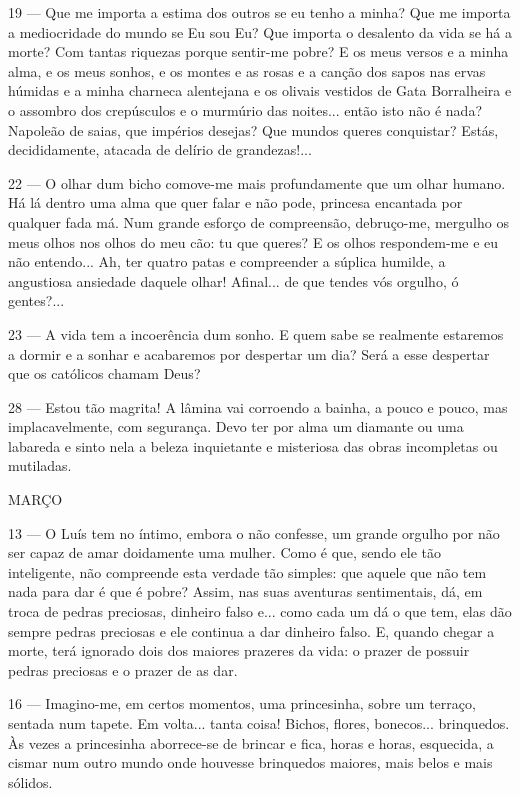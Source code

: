 19 — Que me importa a estima dos outros se eu tenho
a minha? Que me importa a mediocridade do mundo
se  Eu sou Eu? Que importa o desalento da vida se há
a morte? Com tantas riquezas porque sentir-me pobre?
E os meus versos e a minha alma, e os meus sonhos,
e os montes e as rosas e a canção dos sapos nas ervas
húmidas e a minha charneca alentejana e os olivais
vestidos de Gata Borralheira e o assombro dos 
crepúsculos e o murmúrio das noites... então isto não é
nada? Napoleão de saias, que impérios desejas? Que
mundos queres conquistar? Estás, decididamente, 
atacada de delírio de grandezas!...

22 — O olhar dum bicho comove-me mais 
profundamente que um olhar humano. Há lá dentro 
uma alma que quer falar e não pode, princesa encantada
por qualquer fada má. Num grande esforço de compreensão,
debruço-me, mergulho os meus olhos nos olhos do
meu cão: tu que queres? E os olhos respondem-me e
eu não entendo... Ah, ter quatro patas e compreender
a súplica humilde, a angustiosa ansiedade daquele
olhar! Afinal... de que tendes vós orgulho, ó gentes?...

23 — A vida tem a incoerência dum sonho. E quem sabe se 
realmente estaremos a dormir e a sonhar e acabaremos por
despertar um dia? Será a esse despertar que os católicos
chamam Deus?

28 — Estou tão magrita! A lâmina vai corroendo a
bainha, a pouco e pouco, mas implacavelmente, com
segurança. Devo ter por alma um diamante ou uma
labareda e sinto nela a beleza inquietante e misteriosa
das obras incompletas ou mutiladas.

MARÇO

13 — O Luís tem no íntimo, embora o não confesse,
um grande orgulho por não ser capaz de amar 
doidamente uma mulher. Como é que, sendo ele tão 
inteligente, não compreende esta verdade tão simples: que
aquele que não tem nada para dar é que é pobre? Assim,
nas suas aventuras sentimentais, dá, em troca de pedras
preciosas, dinheiro falso e... como cada um dá o que
tem, elas dão sempre pedras preciosas e ele continua a
dar dinheiro falso. E, quando chegar a morte, terá
ignorado dois dos maiores prazeres da vida: o prazer de
possuir pedras preciosas e o prazer de as dar.

16 — Imagino-me, em certos momentos, uma 
princesinha, sobre um terraço, sentada num tapete. Em volta...
tanta coisa! Bichos, flores, bonecos... brinquedos. Às
vezes a princesinha aborrece-se de brincar e fica, horas
e horas, esquecida, a cismar num outro mundo onde
houvesse brinquedos maiores, mais belos e mais
sólidos.

